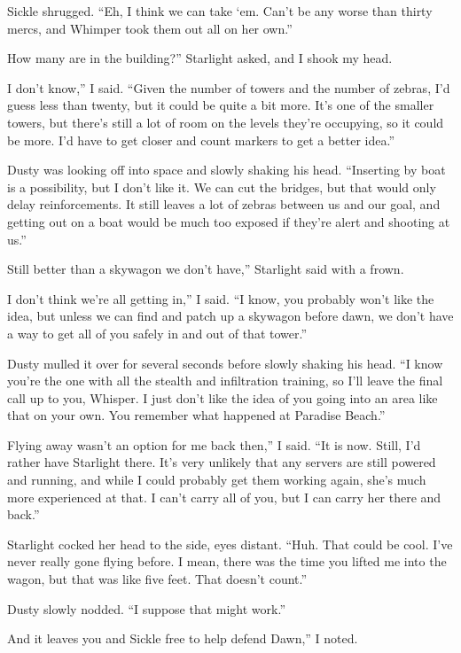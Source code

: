 Sickle shrugged. “Eh, I think we can take ‘em. Can’t be any worse than thirty mercs, and Whimper took them out all on her own.”

\leavevmode{}How many are in the building?” Starlight asked, and I shook my head.

\leavevmode{}I don’t know,” I said. “Given the number of towers and the number of zebras, I’d guess less than twenty, but it could be quite a bit more. It’s one of the smaller towers, but there’s still a lot of room on the levels they’re occupying, so it could be more. I’d have to get closer and count markers to get a better idea.”

Dusty was looking off into space and slowly shaking his head. “Inserting by boat is a possibility, but I don’t like it. We can cut the bridges, but that would only delay reinforcements. It still leaves a lot of zebras between us and our goal, and getting out on a boat would be much too exposed if they’re alert and shooting at us.”

\leavevmode{}Still better than a skywagon we don’t have,” Starlight said with a frown.

\leavevmode{}I don’t think we’re all getting in,” I said. “I know, you probably won’t like the idea, but unless we can find and patch up a skywagon before dawn, we don’t have a way to get all of you safely in and out of that tower.”

Dusty mulled it over for several seconds before slowly shaking his head. “I know you’re the one with all the stealth and infiltration training, so I’ll leave the final call up to you, Whisper. I just don’t like the idea of you going into an area like that on your own. You remember what happened at Paradise Beach.”

\leavevmode{}Flying away wasn’t an option for me back then,” I said. “It is now. Still, I’d rather have Starlight there. It’s very unlikely that any servers are still powered and running, and while I could probably get them working again, she’s much more experienced at that. I can’t carry all of you, but I can carry her there and back.”

Starlight cocked her head to the side, eyes distant. “Huh. That could be cool. I’ve never really gone flying before. I mean, there was the time you lifted me into the wagon, but that was like five feet. That doesn’t count.”

Dusty slowly nodded. “I suppose that might work.”

\leavevmode{}And it leaves you and Sickle free to help defend Dawn,” I noted.

